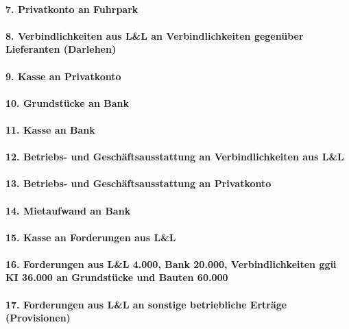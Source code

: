 \documentclass[paper=a4, fontsize=11pt]{scrartcl}
\numberwithin{equation}{section}
\numberwithin{figure}{section}
\numberwithin{table}{section}
\begin{document}
\paragraph{7. Privatkonto an Fuhrpark}

\paragraph{8. Verbindlichkeiten aus L&L an Verbindlichkeiten gegenüber Lieferanten (Darlehen)}

\paragraph{9. Kasse an Privatkonto}

\paragraph{10. Grundstücke an Bank}

\paragraph{11. Kasse an Bank}

\paragraph{12. Betriebs- und Geschäftsausstattung an Verbindlichkeiten aus L&L}

\paragraph{13. Betriebs- und Geschäftsausstattung an Privatkonto}

\paragraph{14. Mietaufwand an Bank}

\paragraph{15. Kasse an Forderungen aus L&L}

\paragraph{16. Forderungen aus L&L 4.000, Bank 20.000, Verbindlichkeiten ggü KI 36.000 an Grundstücke und Bauten 60.000}

\paragraph{17. Forderungen aus L&L an sonstige betriebliche Erträge (Provisionen)}
\end{document}
